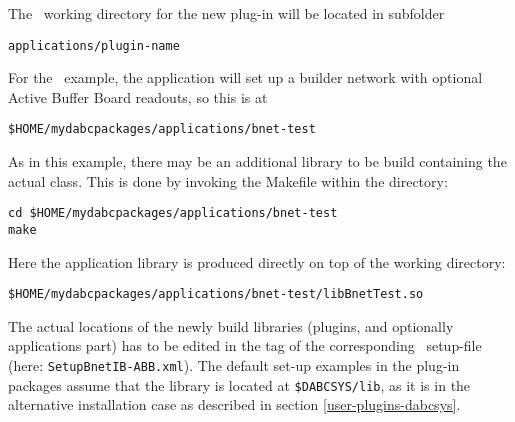 \item The \dabc\ working directory for the new plug-in will be located in
subfolder 
\begin{verbatim}
applications/plugin-name 
\end{verbatim}
For the \ABB\ example, the application
will set up a builder network with optional Active Buffer Board readouts, so this
is at
\begin{verbatim}
$HOME/mydabcpackages/applications/bnet-test
\end{verbatim}
As in this example, there may be an additional library to be build containing the actual
 class. This is done by invoking the Makefile within the directory:
\begin{verbatim}
cd $HOME/mydabcpackages/applications/bnet-test
make
\end{verbatim}
Here the application library is produced directly on top of the working directory: 
\begin{verbatim}
$HOME/mydabcpackages/applications/bnet-test/libBnetTest.so
\end{verbatim}

\item The actual locations of the newly build libraries (plugins, and optionally applications part) has to be edited in the 
 tag of the corresponding \dabc\ setup-file (here: {\tt SetupBnetIB-ABB.xml}).
The default set-up examples in the plug-in packages assume that the library is located
at {\tt \$DABCSYS/lib}, as it is in the alternative installation case as described in
section \ref{user-plugins-dabcsys}.

\enum


